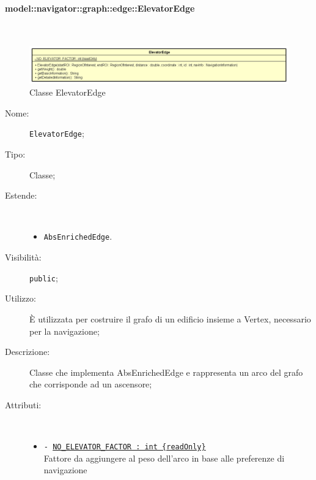 \documentclass[../DefinizioneDiProdotto.tex]{subfiles}
\begin{document}
\paragraph{model::navigator::graph::edge::ElevatorEdge}
\
\begin{figure}[H]
	\centering
	\includegraphics[width=\maxwidth]{img/ElevatorEdge.png}
	\caption{Classe ElevatorEdge}\label{fig:model::navigator::graph::edge::ElevatorEdge} 
\end{figure}
\begin{description}
	\item[Nome:] \texttt{ElevatorEdge};
	\item[Tipo:] Classe;
	\item[Estende:] \
	\begin{itemize}
		\item \texttt{AbsEnrichedEdge}.
	\end{itemize}
	\item[Visibilità:] \texttt{public};
	\item[Utilizzo:] È utilizzata per costruire il grafo di un edificio insieme a Vertex, necessario per la navigazione;
	\item[Descrizione:] Classe che implementa AbsEnrichedEdge e rappresenta un arco del grafo che corrisponde ad un ascensore;
	\item[Attributi:] \
	\begin{itemize}
		\item \texttt{- \underline{NO\_ELEVATOR\_FACTOR : int \{readOnly\}}}\\
		Fattore da aggiungere al peso dell'arco in base alle preferenze di navigazione
		

\end{itemize}
\end{description}
\end{document}
